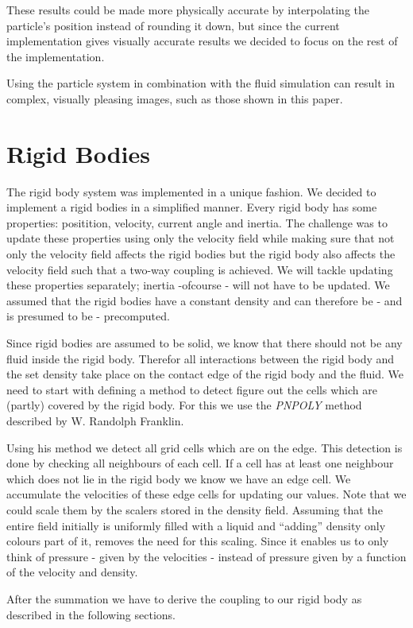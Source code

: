 \documentclass[a4paper,twoside,11pt,twocolumn]{article}
\begin{document}
These results could be made more physically accurate by interpolating the particle's position instead of rounding it down, but since the current implementation gives visually accurate results we decided to focus on the rest of the implementation.

Using the particle system in combination with the fluid simulation can result in complex, visually pleasing images, such as those shown in this paper.

\section{Rigid Bodies}
The rigid body system was implemented in a unique fashion. We decided to implement a rigid bodies in a simplified manner. Every rigid body has some properties: positition, velocity, current angle and inertia. The challenge was to update these properties using only the velocity field while making sure that not only the velocity field affects the rigid bodies but the rigid body also affects the velocity field such that a two-way coupling is achieved. We will tackle updating these properties separately; inertia -ofcourse - will not have to be updated. We assumed that the rigid bodies have a constant density and can therefore be - and is presumed to be -  precomputed.

Since rigid bodies are assumed to be solid, we know that there should not be any fluid inside the rigid body. Therefor all interactions between the rigid body and the set density take place on the contact edge of the rigid body and the fluid. We need to start with defining a method to detect figure out the cells which are (partly) covered by the rigid body. For this we use the \emph{PNPOLY}\cite{url:pnpoly} method described by W. Randolph Franklin.

Using his method we detect all grid cells which are on the edge. This detection is done by checking all neighbours of each cell. If a cell has at least one neighbour which does not lie in the rigid body we know we have an edge cell. We accumulate the velocities of these edge cells for updating our values. Note that we could scale them by the scalers stored in the density field. Assuming that the entire field initially is uniformly filled with a liquid and ``adding'' density only colours part of it, removes the need for this scaling. Since it enables us to only think of pressure - given by the velocities - instead of pressure given by a function of the velocity and density.

After the summation we have to derive the coupling to our rigid body as described in the following sections.
\end{document}

